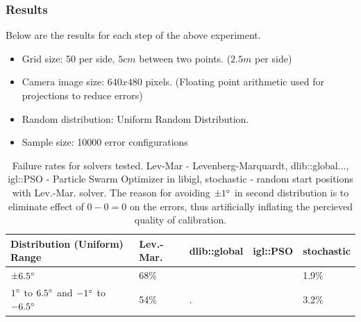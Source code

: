 \documentclass[english, printversion, nomenclature, notitle]{tuvisionthesis} %
\begin{document}
\subsubsection{Results}

Below are the results for each step of the above experiment.

\begin{itemize}
	\item Grid size: 50 per side, $5cm$ between two points. ($2.5m$ per side)
	\item Camera image size: $640 x 480$ pixels. (Floating point arithmetic used for projections to reduce errors)
	\item Random distribution: Uniform Random Distribution.
	\item Sample size: 10000 error configurations
\end{itemize}

\begin{table}[]
	\begin{tabular}{|l|l|l|l|l|}
		\hline
	Distribution (Uniform) Range & Lev.-Mar.  & dlib::global & igl::PSO & stochastic \\
	\hline
	$\pm6.5\degree$& 68\% &  &  & 1.9\% \\
	$1\degree$ to $6.5\degree$ and $-1\degree$ to $-6.5\degree$	& 54\% & . &  &3.2\% \\ \hline

	\end{tabular}
\caption{Failure rates for solvers tested. Lev-Mar - Levenberg-Marquardt, dlib::global..., igl::PSO - Particle Swarm Optimizer in libigl, stochastic - random start positions with Lev.-Mar. solver. The reason for avoiding $\pm1\degree$ in second distribution is to eliminate effect of $0 - 0 = 0$ on the errors, thus artificially inflating the percieved quality of calibration.}
\end{table}

\begin{center}
  \noindent{}
\end{center}
\end{document}

